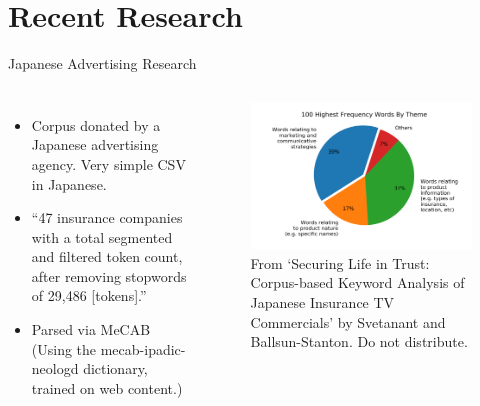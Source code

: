 \documentclass[aspectratio=1610, 11pt]{beamer} %
\begin{document}
\section{Recent Research}
\begin{frame}{Japanese Advertising Research}
\begin{columns}

\begin{itemize}[label=\textbullet]
    \item Corpus donated by a Japanese advertising agency. Very simple CSV in Japanese.
    \item ``47 insurance companies with a total segmented and filtered token count, after removing stopwords of 29,486 [tokens].'' 
    \item Parsed via MeCAB (Using the mecab-ipadic-neologd dictionary, trained on web content.)

\end{itemize}





\begin{figure}
    \includegraphics[width=\textwidth]{figures/Figure1.png}
    \caption{From `Securing Life in Trust: Corpus-based Keyword Analysis of Japanese Insurance TV Commercials' by Svetanant and Ballsun-Stanton. Do not distribute.}
    \label{fig:userstory}
\end{figure}

\end{columns}
\end{frame}
\end{document}

